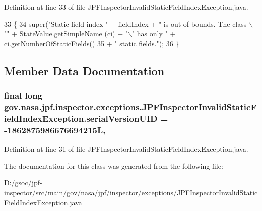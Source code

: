 Definition at line 33 of file J\+P\+F\+Inspector\+Invalid\+Static\+Field\+Index\+Exception.\+java.


\begin{DoxyCode}
33                                                                                      \{
34     super(\textcolor{stringliteral}{"Static field index "} + fieldIndex + \textcolor{stringliteral}{" is out of bounds. The class \(\backslash\)""} + StateValue.getSimpleName
      (ci) + \textcolor{stringliteral}{"\(\backslash\)" has only "} + ci.getNumberOfStaticFields()
35         + \textcolor{stringliteral}{" static fields."});
36   \}
\end{DoxyCode}


\subsection{Member Data Documentation}
\subsubsection[{\texorpdfstring{serial\+Version\+U\+ID}{serialVersionUID}}]{\setlength{\rightskip}{0pt plus 5cm}final long gov.\+nasa.\+jpf.\+inspector.\+exceptions.\+J\+P\+F\+Inspector\+Invalid\+Static\+Field\+Index\+Exception.\+serial\+Version\+U\+ID = -\/1862875986676694215L\hspace{0.3cm}{\ttfamily [static]}, {\ttfamily [private]}}\hypertarget{classgov_1_1nasa_1_1jpf_1_1inspector_1_1exceptions_1_1_j_p_f_inspector_invalid_static_field_index_exception_a09c64ee5ad3db2e6852f636528bbc034}{}\label{classgov_1_1nasa_1_1jpf_1_1inspector_1_1exceptions_1_1_j_p_f_inspector_invalid_static_field_index_exception_a09c64ee5ad3db2e6852f636528bbc034}


Definition at line 31 of file J\+P\+F\+Inspector\+Invalid\+Static\+Field\+Index\+Exception.\+java.



The documentation for this class was generated from the following file\+:\begin{DoxyCompactItemize}
\item 
D\+:/gsoc/jpf-\/inspector/src/main/gov/nasa/jpf/inspector/exceptions/\hyperlink{_j_p_f_inspector_invalid_static_field_index_exception_8java}{J\+P\+F\+Inspector\+Invalid\+Static\+Field\+Index\+Exception.\+java}\end{DoxyCompactItemize}
